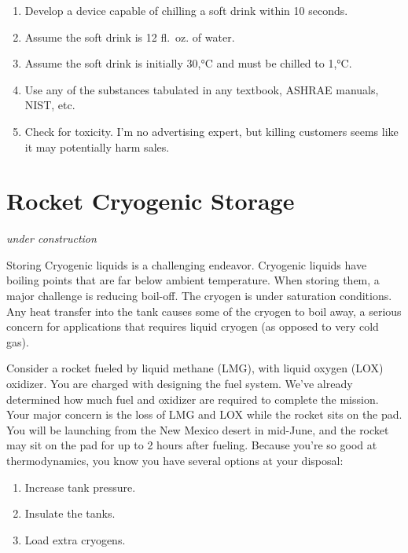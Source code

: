 \documentclass[
]{book}
\providecommand{\tightlist}{%
  \setlength{\itemsep}{0pt}\setlength{\parskip}{0pt}}
\begin{document}
\begin{enumerate}
\def\labelenumi{\arabic{enumi}.}
\tightlist
\item
  Develop a device capable of chilling a soft drink within 10 seconds.
\item
  Assume the soft drink is 12 fl.~oz. of water.\\
\item
  Assume the soft drink is initially 30,°C and must be chilled to 1,°C.
\item
  Use any of the substances tabulated in any textbook, ASHRAE manuals, NIST, etc.
\item
  Check for toxicity. I'm no advertising expert, but killing customers seems like it may potentially harm sales.
\end{enumerate}

\hypertarget{rocket-cryogenic-storage}{%
\chapter{Rocket Cryogenic Storage}\label{rocket-cryogenic-storage}}

\emph{under construction}

Storing Cryogenic liquids is a challenging endeavor.
Cryogenic liquids have boiling points that are far below ambient temperature.
When storing them, a major challenge is reducing boil-off.
The cryogen is under saturation conditions.
Any heat transfer into the tank causes some of the cryogen to boil away, a serious concern for applications that requires liquid cryogen (as opposed to very cold gas).

Consider a rocket fueled by liquid methane (LMG), with liquid oxygen (LOX) oxidizer.
You are charged with designing the fuel system.
We've already determined how much fuel and oxidizer are required to complete the mission. Your major concern is the loss of LMG and LOX while the rocket sits on the pad. You will be launching from the New Mexico desert in mid-June, and the rocket may sit on the pad for up to 2 hours after fueling.
Because you're so good at thermodynamics, you know you have several options at your disposal:

\begin{enumerate}
\def\labelenumi{\arabic{enumi}.}
\tightlist
\item
  Increase tank pressure.
\item
  Insulate the tanks.
\item
  Load extra cryogens.
\end{enumerate}
\end{document}
